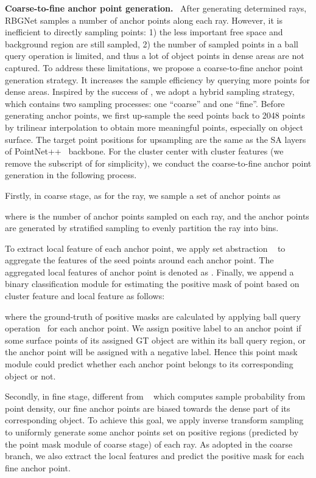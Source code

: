 \documentclass[final]{cvpr}
\begin{document}
\noindent
\textbf{Coarse-to-fine anchor point generation.}~
After generating determined rays, RBGNet samples a number of anchor points 
along each ray. However, it is inefficient to directly sampling points: 1) 
the less important free space and background region 
are still sampled, 2) the number of sampled points in a ball query operation is limited, and thus a lot of object points in dense areas are not captured. 
To address these limitations, we propose a coarse-to-fine anchor point generation strategy. 
It increases the sample efficiency by querying more points for dense areas. 
Inspired by the success of \cite{mildenhall2020nerf}, we adopt a hybrid sampling strategy, which contains two sampling processes: one ``coarse'' and one ``fine''. Before generating anchor points, we first up-sample the seed points back to 2048 points by trilinear interpolation to obtain more meaningful points, especially on object surface. The target point positions for upsampling are the same as the  SA layers of PointNet++~\cite{qi2018pointnnetplus} backbone.   
For the  cluster center with cluster features  (we remove the subscript  of  for simplicity), we conduct the coarse-to-fine anchor point generation in the following process.  

Firstly, in coarse stage, as for the  ray, we sample a set of anchor points  as
 
where  is the number of anchor points sampled on each ray, and the anchor points are generated by stratified sampling to evenly partition the ray into  bins. 

To extract local feature of each anchor point, we apply set abstraction ~\cite{qi2018pointnnetplus} to aggregate the features of the seed points around each anchor point. The aggregated local features of anchor point  is denoted as  . Finally, we append a binary classification module for estimating the positive mask  of point  based on cluster feature  and local feature  as follows:

where the ground-truth of positive masks are calculated by applying ball query operation~\cite{qi2018pointnnetplus} for each anchor point. We assign positive label to an anchor point if some surface points of its assigned GT object are within its ball query region, or the anchor point will be assigned with a negative label.  
Hence this point mask module could predict whether each anchor point belongs to its corresponding object or not. 

Secondly, in fine stage, different from ~\cite{mildenhall2020nerf} which computes sample probability from point density, our fine anchor points are biased towards the dense part of its corresponding object. 
To achieve this goal, 
we apply inverse transform sampling to uniformly generate some  anchor points set  on positive regions (predicted by the point mask module of coarse stage) of each ray. 
As adopted in the coarse branch, we also extract the local features and predict the positive mask for each fine anchor point. 
\end{document}

